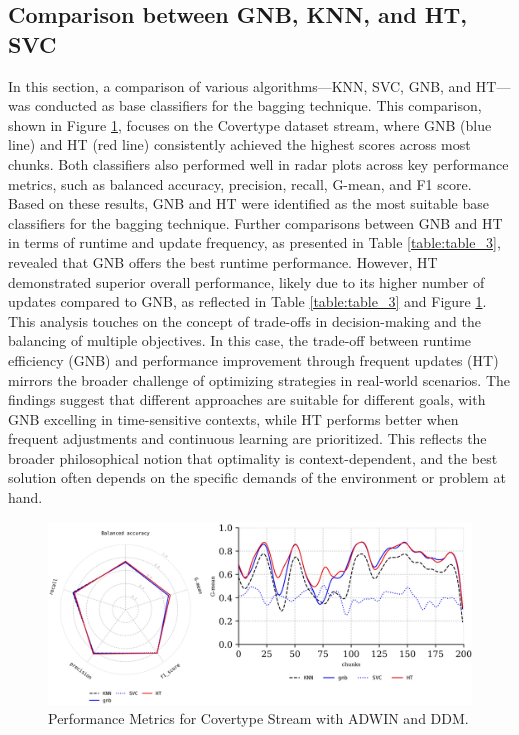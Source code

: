 \subsection{Comparison between GNB, KNN, and HT, SVC}
\label{sec:compared_base_calssfier}
In this section, a comparison of various algorithms—KNN, SVC, GNB, and HT—was conducted as base classifiers for the bagging technique. This comparison, shown in Figure \ref{fig:res4}, focuses on the Covertype dataset stream, where GNB (blue line) and HT (red line) consistently achieved the highest scores across most chunks. Both classifiers also performed well in radar plots across key performance metrics, such as balanced accuracy, precision, recall, G-mean, and F1 score. Based on these results, GNB and HT were identified as the most suitable base classifiers for the bagging technique. Further comparisons between GNB and HT in terms of runtime and update frequency, as presented in Table \ref{table:table_3}, revealed that GNB offers the best runtime performance. However, HT demonstrated superior overall performance, likely due to its higher number of updates compared to GNB, as reflected in Table \ref{table:table_3} and Figure \ref{fig:res4}. This analysis touches on the concept of trade-offs in decision-making and the balancing of multiple objectives. In this case, the trade-off between runtime efficiency (GNB) and performance improvement through frequent updates (HT) mirrors the broader challenge of optimizing strategies in real-world scenarios. The findings suggest that different approaches are suitable for different goals, with GNB excelling in time-sensitive contexts, while HT performs better when frequent adjustments and continuous learning are prioritized. This reflects the broader philosophical notion that optimality is context-dependent, and the best solution often depends on the specific demands of the environment or problem at hand.

\begin{figure}[t]
	\centering
	\includegraphics[width=1\linewidth]{5_Emerging/images/res4.png}
	\caption{Performance Metrics for Covertype Stream with ADWIN and DDM.}

	\label{fig:res4}
\end{figure}				

